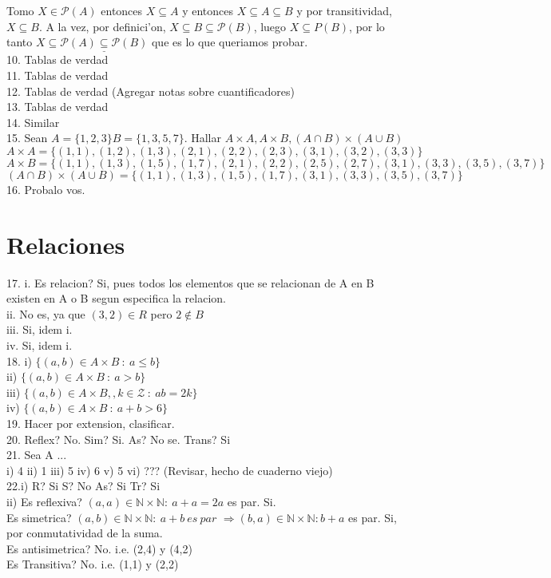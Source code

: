 \documentclass[10pt, a4paper]{book}
\begin{document}
Tomo \(X \in \mathcal{P}(A) \) entonces \(X \subseteq A \) y entonces \(X \subseteq A \subseteq B\) y por transitividad, \(X \subseteq B\). A la vez, por definici'on, \(X \subseteq B \subseteq \mathcal{P}(B) \), luego \(X \subseteq {P}(B) \), por lo tanto \(X \subseteq \underline{\mathcal{P}(A) \subseteq \mathcal{P}(B)} \) que es lo que queriamos probar.\\
10. Tablas de verdad\\
11. Tablas de verdad \\
12. Tablas de verdad (Agregar notas sobre cuantificadores) \\
13. Tablas de verdad \\
14. Similar \\
15. Sean \(A=\{1,2,3\} B=\{1,3,5,7\}\). Hallar \(A\times A, A\times B, (A\cap B)\times(A\cup B)\)\\
\(A \times A= \{(1,1),(1,2),(1,3),(2,1),(2,2),(2,3),(3,1),(3,2),(3,3)\} \)\\
\(A \times B= \{(1,1),(1,3),(1,5),(1,7),(2,1),(2,2),(2,5),(2,7),(3,1),(3,3),(3,5),(3,7)\} \)\\
\((A\cap B)\times(A\cup B)=\{(1,1),(1,3),(1,5),(1,7),(3,1),(3,3),(3,5),(3,7)\} \)\\
16. Probalo vos. \\
\section{Relaciones}
17. i. Es relacion? Si, pues todos los elementos que se relacionan de A en B existen en A o B segun especifica la relacion.\\
ii. No es, ya que \( (3,2) \in R\) pero \(2 \not\in B\)\\
iii. Si, idem i.\\
iv. Si, idem i. \\
18. i) \(\{(a,b)\in A \times B\: : \: a\leq b\}\)\\
ii) \(\{(a,b)\in A \times B\: : \: a > b\}\)\\
iii) \(\{(a,b)\in A \times B, , k \in \mathcal{Z}\: : \: ab = 2k\}\)\\
iv) \(\{(a,b)\in A \times B\: : \: a + b > 6\}\)\\
19. Hacer por extension, clasificar.\\
20. Reflex?  No. Sim? Si. As? No se. Trans? Si\\
21. Sea A ... \\
i) 4 ii) 1 iii) 5 iv) 6 v) 5 vi) ??? (Revisar, hecho de cuaderno viejo)\\
22.i) R? Si S? No As? Si Tr? Si\\
ii) Es reflexiva? \((a,a) \in \mathbb{N} \times \mathbb{N} : \: a+a=2a\) es par. Si. \\
Es simetrica? \((a,b) \in \mathbb{N} \times \mathbb{N} : \: a+b\: es\:par \) \(\Rightarrow(b,a) \in \mathbb{N} \times \mathbb{N}: b+a\) es par. Si, por conmutatividad de la suma. \\
Es antisimetrica? No. i.e. (2,4) y (4,2)\\
Es Transitiva? No. i.e. (1,1) y (2,2) 
\end{document}
